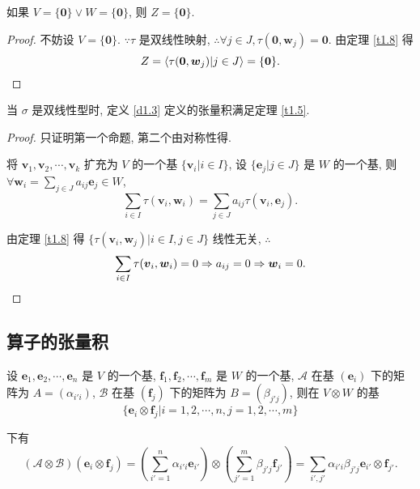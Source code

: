 \documentclass{ctexart}
\begin{document}
\begin{corollary}
    如果 $V=\{\boldsymbol{0}\}\vee W=\{\boldsymbol{0}\}$, 则 $Z=\{\boldsymbol{0}\}$.
\end{corollary}
\begin{proof}
    不妨设 $V=\{\boldsymbol{0}\}$. $\because\tau$ 是双线性映射, $\therefore\forall j\in J,\tau(\boldsymbol{0},\boldsymbol{w}_j)=\boldsymbol{0}$. 由定理 \ref{t1.8} 得
    \[Z=\left<\tau(\boldsymbol{0},\boldsymbol{w}_j)|j\in J\right>=\{\boldsymbol{0}\}.\qedhere\]
\end{proof}
\begin{corollary}
    当 $\sigma$ 是双线性型时, 定义 \ref{d1.3} 定义的张量积满足定理 \ref{t1.5}.
\end{corollary}
\begin{proof}
    只证明第一个命题, 第二个由对称性得.

    将 $\boldsymbol{v}_1,\boldsymbol{v}_2,\cdots,\boldsymbol{v}_k$ 扩充为 $V$ 的一个基 $\{\boldsymbol{v}_i|i\in I\}$, 设 $\{\boldsymbol{e}_j|j\in J\}$ 是 $W$ 的一个基, 则 $\forall\boldsymbol{w}_i=\sum\limits_{j\in J}a_{ij}\boldsymbol{e}_j\in W$,
    \[\sum\limits_{i\in I}\tau(\boldsymbol{v}_i,\boldsymbol{w}_i)=\sum\limits_{j\in J}a_{ij}\tau(\boldsymbol{v}_i,\boldsymbol{e}_j).\]

    由定理 \ref{t1.8} 得 $\{\tau(\boldsymbol{v}_i,\boldsymbol{w}_j)|i\in I,j\in J\}$ 线性无关, $\therefore$
    \[\sum\limits_{i\in I}\tau(\boldsymbol{v}_i,\boldsymbol{w}_i)=0\Rightarrow a_{ij}=0\Rightarrow \boldsymbol{w}_i=0.\qedhere\]
\end{proof}
 \subsection{算子的张量积}
设 $\boldsymbol{e}_1,\boldsymbol{e}_2,\cdots,\boldsymbol{e}_n$ 是 $V$ 的一个基, $\boldsymbol{f}_1,\boldsymbol{f}_2,\cdots,\boldsymbol{f}_m$ 是 $W$ 的一个基, $\mathcal{A}$ 在基 $(\boldsymbol{e}_i)$ 下的矩阵为 $A=(\alpha_{i'i})$, $\mathcal{B}$ 在基 $(\boldsymbol{f}_j)$ 下的矩阵为 $B=(\beta_{j'j})$, 则在 $V\otimes W$ 的基
\begin{equation}\label{eq1.3}
    \{\boldsymbol{e}_i\otimes\boldsymbol{f}_j|i=1,2,\cdots,n,j=1,2,\cdots,m\}
\end{equation}

下有
\[(\mathcal{A}\otimes\mathcal{B})(\boldsymbol{e}_i\otimes\boldsymbol{f}_j)=\left(\sum\limits_{i'=1}^n\alpha_{i'i}\boldsymbol{e}_{i'}\right)\otimes\left(\sum\limits_{j'=1}^m\beta_{j'j}\boldsymbol{f}_{j'}\right)=\sum\limits_{i',j'}\alpha_{i'i}\beta_{j'j}\boldsymbol{e}_{i'}\otimes\boldsymbol{f}_{j'}.\]
\end{document}
